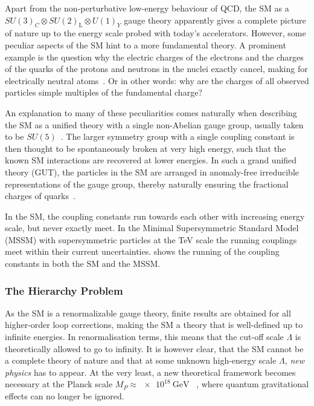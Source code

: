Apart from the non-perturbative low-energy behaviour of QCD, the SM as a $SU(3)_C\otimes SU(2)_\mathrm{L}\otimes U(1)_Y$ gauge theory apparently gives a complete picture of nature up to the energy scale probed with today's accelerators. However, some peculiar aspects of the SM hint to a more fundamental theory. A prominent example is the question why the electric charges of the electrons and the charges of the quarks of the protons and neutrons in the nuclei exactly cancel, making for electrically neutral atoms~\cite{Brock:1354959}. Or in other words: why are the charges of all observed particles simple multiples of the fundamental charge?

An explanation to many of these peculiarities comes naturally when describing the SM as a unified theory with a single non-Abelian gauge group, usually taken to be $SU(5)$~\cite{PhysRevLett.32.438}. The larger symmetry group with a single coupling constant is then thought to be spontaneously broken at very high energy, such that the known SM interactions are recovered at lower energies. In such a grand unified theory (GUT), the particles in the SM are arranged in anomaly-free  irreducible representations of the gauge group, thereby \eg naturally ensuring the fractional charges of quarks~\cite{Peskin:1995ev}.

In the SM, the coupling constants run towards each other with increasing energy scale, but never exactly meet. In the Minimal Supersymmetric Standard Model (MSSM) with supersymmetric particles at the TeV scale the running couplings meet within their current uncertainties.  shows the running of the coupling constants in both the SM and the MSSM.

\subsubsection{The Hierarchy Problem}

As the SM is a renormalizable gauge theory, finite results are obtained for all higher-order loop corrections, making the SM a theory that is well-defined up to infinite energies. In renormalisation terms, this means that the cut-off scale $\Lambda$ is theoretically allowed to go to infinity. It is however clear, that the SM cannot be a complete theory of nature and that at some unknown high-energy scale $\Lambda$, \textit{new physics} has to appear. At the very least, a new theoretical framework becomes necessary at the Planck scale $M_P \approx \SI{e18}{\GeV}$ ~\cite{Martin:1997ns}, where quantum gravitational effects can no longer be ignored.


